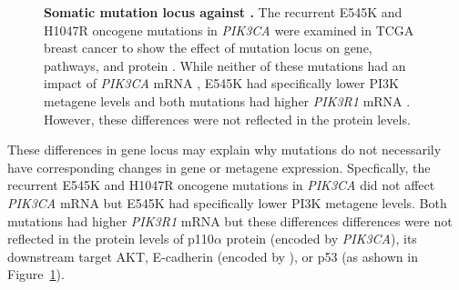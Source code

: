 \begin{figure}[!ht]
\begin{center}
    \end{center}
    \caption[Somatic \gls{mutation} locus against ]{\small \textbf{Somatic \gls{mutation} locus against .} The recurrent E545K and H1047R \gls{oncogene} \glspl{mutation} in \textit{PIK3CA} were examined in \gls{TCGA} breast cancer to show the effect of \gls{mutation} locus on gene, \glspl{pathway}, and protein . While neither of these \glspl{mutation} had an impact of \textit{PIK3CA} \acrshort{mRNA} , E545K had specifically lower PI3K \citep{Gatza2011} \gls{metagene} levels and both \glspl{mutation} had higher \textit{PIK3R1} \acrshort{mRNA} . However, these differences were not reflected in the protein  levels.
}
\label{fig:mutation_expr}
\end{figure}

These differences in gene locus may explain why \glspl{mutation} do not necessarily have corresponding changes in gene or meta\gls{gene expression}. Specfically, the recurrent E545K and H1047R \gls{oncogene} \glspl{mutation} in \textit{PIK3CA} did not affect \textit{PIK3CA} \acrshort{mRNA}  but E545K had specifically lower PI3K \citep{Gatza2011} \gls{metagene} levels. Both \glspl{mutation} had higher \textit{PIK3R1} \acrshort{mRNA}  but these differences differences were not reflected in the protein  levels of p110$\alpha$ protein (encoded by \textit{PIK3CA}), its downstream target AKT, \gls{E-cadherin} (encoded by ), or p53 (as ashown in Figure~\ref{fig:mutation_expr}).

